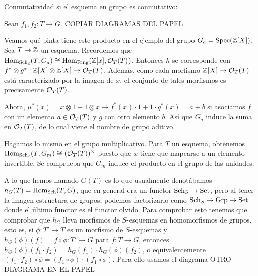\documentclass[GA.tex]{subfiles}
\begin{document}
\begin{dem}
Conmutatividad si el esquema en grupo es conmutativo:

Sean $f_1,f_2:T\to G$. COPIAR DIAGRAMAS DEL PAPEL
\end{dem}


\begin{ej}
Veamos qué pinta tiene este producto en el ejemplo del grupo $G_a=\operatorname{Spec}(\mathbb{Z}[X])$. Sea $T\to\mathbb{Z}$ un esquema. Recordemos que $\operatorname{Hom}_{\operatorname{Sch}_{\mathbb{Z}}}(T,G_a)\cong\operatorname{Hom}_{\operatorname{Ring}}(\mathbb{Z}[x],{\mathcal O}_T(T))$. Entonces $h$ se corresponde con $f^*\otimes g^*:\mathbb{Z}[X]\otimes\mathbb{Z}[X]\to{\mathcal O}_T(T)$. Además, como cada morfismo $\mathbb{Z}[X]\to{\mathcal O}_T(T)$ está caracterizado por la imagen de $x$, el conjunto de tales morfismos es precisamente ${\mathcal O}_T(T)$. 

Ahora, $\mu^*(x)=x\otimes 1+1\otimes x\mapsto f^*(x)\cdot 1+1\cdot g^*(x)=a+b$ si asociamos $f$ con un elemento $a\in{\mathcal O}_T(T)$ y $g$ con otro elemento $b$. Así que $G_a$ induce la suma en ${\mathcal O}_T(T)$, de lo cual viene el nombre de grupo aditivo. 
\end{ej}

\begin{ej}
Hagamos lo mismo en el grupo multiplicativo. Para $T$ un esquema, obtenemos $\operatorname{Hom}_{\operatorname{Sch}_{\mathbb{Z}}}(T,G_m)\cong({\mathcal O}_T(T))^\times$ puesto que $x$ tiene que mapearse a un elemento invertible. Se comprueba que $G_m$ induce el producto en el grupo de las unidades. 
\end{ej}


A lo que hemos llamado $G(T)$ es lo que usualmente denotábamos $h_G(T)=\operatorname{Hom}_{\operatorname{Sch}}(T,G)$, que en general era un functor $\operatorname{Sch}_S\to\operatorname{Set}$, pero al tener la imagen estructura de grupos, podemos factorizarlo como $\operatorname{Sch}_S\to\operatorname{Grp}\to\operatorname{Set}$ donde el último functor es el functor olvido. Para comprobar esto tenemos que comprobar que $h_G$ lleva morfismos de $S$-esquemas en homomorfismos de grupos, esto es, si $\phi:T'\to T$ es un morfismo de $S$-esquemas y $h_G(\phi)(f)=f\circ\phi:T'\to G$ para $f:T\to G$, entonces $h_G(\phi)(f_1\cdot f_2)=h_G(f_1)\cdot h_G(\phi)(f_2)$, o equivalentemente $(f_1\cdot f_2)\circ\phi=(f_1\circ\phi)\cdot (f_1\circ\phi)$.  Para ello usamos el diagrama OTRO DIAGRAMA EN EL PAPEL
\end{document}
